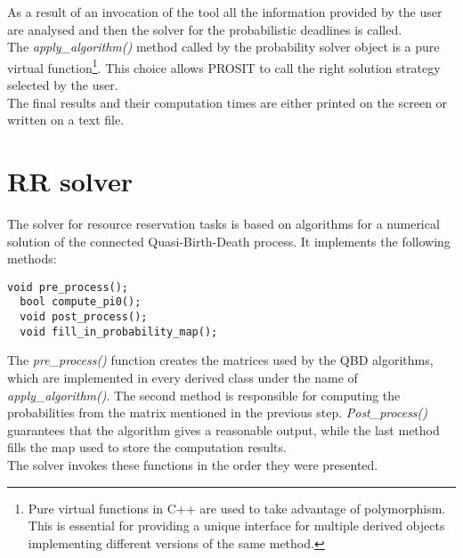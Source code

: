 As a result of an invocation of the tool all the information provided by the user are analysed and then the solver for the probabilistic deadlines is called.\\ 
The \emph{apply\_algorithm()} method called by the probability solver object is a pure virtual function\footnote{Pure virtual functions in C++ are used to take advantage of polymorphism. This is essential for providing a unique interface for multiple derived objects implementing different versions of the same method.}. This choice allows PROSIT to call the right solution strategy selected by the user.\\
The final results and their computation times are either printed on the screen or written on a text file.

\section{RR solver}
The solver for resource reservation tasks is based on algorithms for a numerical solution of the connected Quasi-Birth-Death process. It implements the following methods:
\begin{lstlisting}[frame=bt]
  void pre_process();
  bool compute_pi0();
  void post_process();
  void fill_in_probability_map();
\end{lstlisting}

The \emph{pre\_process()} function creates the matrices used by the QBD algorithms, which are implemented in every derived class under the name of \emph{apply\_algorithm()}. The second method is responsible for computing the probabilities from the matrix mentioned in the previous step. \emph{Post\_process()} guarantees that the algorithm gives a reasonable output, while the last method fills the map used to store the computation results.\\
The solver invokes these functions in the order they were presented.

